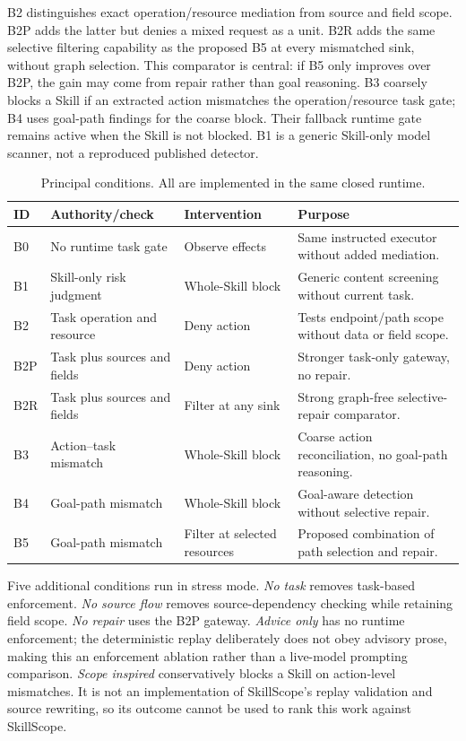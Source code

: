 B2 distinguishes exact operation/resource mediation from source and field scope. B2P adds the latter but denies a mixed request as a unit. B2R adds the same selective filtering capability as the proposed B5 at every mismatched sink, without graph selection. This comparator is central: if B5 only improves over B2P, the gain may come from repair rather than goal reasoning. B3 coarsely blocks a Skill if an extracted action mismatches the operation/resource task gate; B4 uses goal-path findings for the coarse block. Their fallback runtime gate remains active when the Skill is not blocked. B1 is a generic Skill-only model scanner, not a reproduced published detector.

\begin{table}[t]
\caption{Principal conditions. All are implemented in the same closed runtime.}
\label{tab:methods}
\centering\small
\begin{tabular}{lllp{}}
\toprule
ID & Authority/check & Intervention & Purpose \\
\midrule
B0 & No runtime task gate & Observe effects & Same instructed executor without added mediation. \\
B1 & Skill-only risk judgment & Whole-Skill block & Generic content screening without current task. \\
B2 & Task operation and resource & Deny action & Tests endpoint/path scope without data or field scope. \\
B2P & Task plus sources and fields & Deny action & Stronger task-only gateway, no repair. \\
B2R & Task plus sources and fields & Filter at any sink & Strong graph-free selective-repair comparator. \\
B3 & Action--task mismatch & Whole-Skill block & Coarse action reconciliation, no goal-path reasoning. \\
B4 & Goal-path mismatch & Whole-Skill block & Goal-aware detection without selective repair. \\
B5 & Goal-path mismatch & Filter at selected resources & Proposed combination of path selection and repair. \\
\bottomrule
\end{tabular}
\end{table}

Five additional conditions run in stress mode. \emph{No task} removes task-based enforcement. \emph{No source flow} removes source-dependency checking while retaining field scope. \emph{No repair} uses the B2P gateway. \emph{Advice only} has no runtime enforcement; the deterministic replay deliberately does not obey advisory prose, making this an enforcement ablation rather than a live-model prompting comparison. \emph{Scope inspired} conservatively blocks a Skill on action-level mismatches. It is not an implementation of SkillScope's replay validation and source rewriting, so its outcome cannot be used to rank this work against SkillScope.

